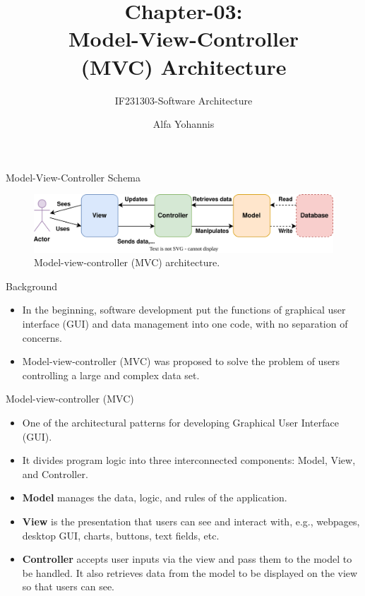 \documentclass[aspectratio=169, table]{beamer}
\title{Chapter-03:\\Model-View-Controller\\(MVC) Architecture}
\subtitle{IF231303-Software Architecture}
\author{Alfa Yohannis}
\begin{document}
	\begin{frame}[plain]
		\maketitle
	\end{frame}

	\begin{frame}{Model-View-Controller Schema}
		\begin{figure}[h]
			\centering
			\includegraphics[width=\textwidth]{mvc}
			\caption{Model-view-controller (MVC) architecture.}
			\label{fig:mvc}
		\end{figure}
	\end{frame}

	\begin{frame}{Background}
		\begin{itemize}
			\item In the beginning, software development put the functions of graphical user interface (GUI) and data management into one code, with no separation of concerns.
			\item Model-view-controller (MVC) was proposed to solve the problem of users controlling a large and complex data set.
		\end{itemize}
	\end{frame}

	\begin{frame}{Model-view-controller (MVC)}
		\begin{itemize}
			\item One of the architectural patterns for developing Graphical User Interface (GUI).
			\item It divides program logic into three interconnected components: Model, View, and Controller.
			\item \textbf{Model} manages the data, logic, and rules of the application.
			\item \textbf{View} is the presentation that users can see and interact with, e.g., webpages, desktop GUI, charts, buttons, text fields, etc.
			\item \textbf{Controller} accepts user inputs via the view and pass them to the model to be handled. It also retrieves data from the model to be displayed on the view so that users can see.

		\end{itemize}
	\end{frame}
\end{document}

